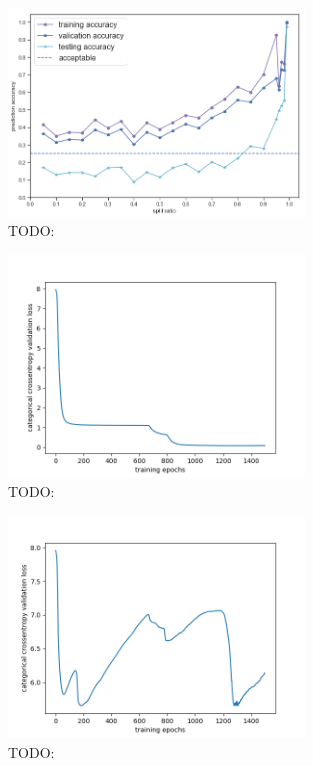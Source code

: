 \begin{figure}[H]
    \centering
    \includegraphics[width=0.7\textwidth]{figures/acc}
    \caption{TODO:}
    \label{fig:acc}
\end{figure}

\begin{figure}[H]
    \centering
    \includegraphics[width=0.7\textwidth]{figures/loss1}
    \caption{TODO:}
    \label{fig:loss1}
\end{figure}

\begin{figure}[H]
    \centering
    \includegraphics[width=0.7\textwidth]{figures/loss2}
    \caption{TODO:}
    \label{fig:loss2}
\end{figure}

